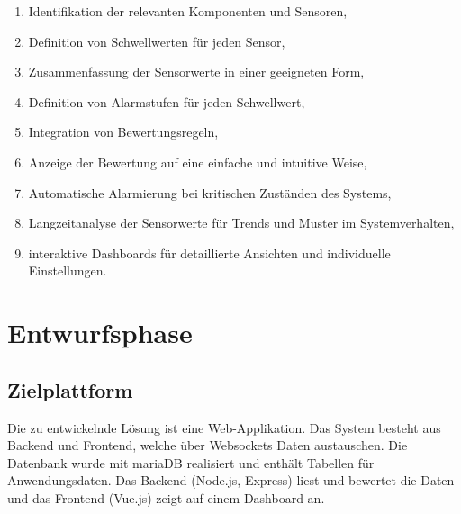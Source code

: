 \begin{flushleft}
	\begin{enumerate}
	\item Identifikation der relevanten Komponenten und Sensoren,
	\item Definition von Schwellwerten für jeden Sensor,
	\item Zusammenfassung der Sensorwerte in einer geeigneten Form,
	\item Definition von Alarmstufen für jeden Schwellwert,
	\item Integration von Bewertungsregeln,
	\item Anzeige der Bewertung auf eine einfache und intuitive Weise,
	\item Automatische Alarmierung bei kritischen Zuständen des Systems,
	\item Langzeitanalyse der Sensorwerte für Trends und Muster im Systemverhalten,
	\item interaktive Dashboards für detaillierte Ansichten und individuelle Einstellungen.
	\end{enumerate}



	\section{Entwurfsphase}

	\subsection{Zielplattform}
	Die zu entwickelnde Lösung ist eine Web-Applikation.
	Das System besteht aus Backend und Frontend, welche über Websockets Daten austauschen.
	Die Datenbank wurde mit mariaDB realisiert und enthält Tabellen für Anwendungsdaten.
	Das Backend (Node.js, Express) liest und bewertet die Daten und das Frontend (Vue.js) zeigt auf einem Dashboard an.

\end{flushleft}
